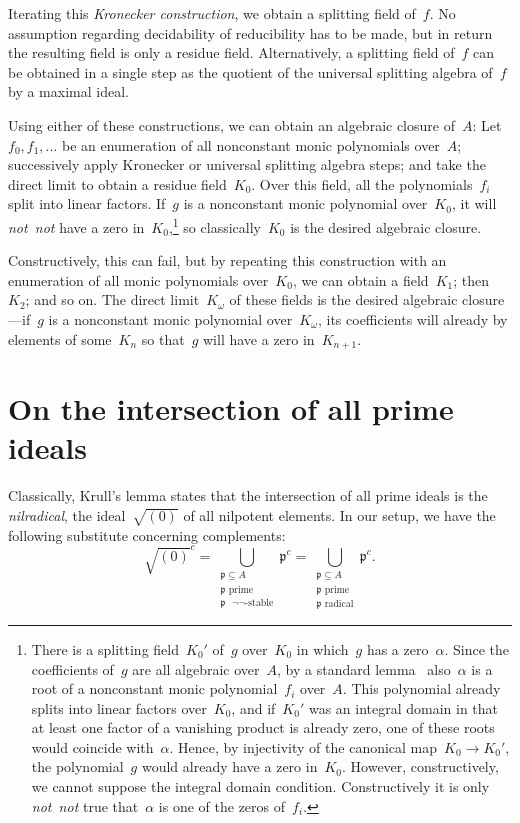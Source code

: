 \documentclass[com,11pt,crcready]{iosart2x}
\theoremstyle{definition}
\theoremstyle{plain}
\theoremstyle{remark}
\newcommand{\?}{\,{:}\,}
\newcommand{\ppp}{\mathfrak{p}}
\renewcommand{\_}{\mathpunct{.}\,}
\begin{document}
Iterating this \emph{Kronecker construction}, we obtain a splitting field of~$f$. No
assumption regarding decidability of reducibility has to be made, but in return
the resulting field is only a residue field. Alternatively, a splitting field
of~$f$ can be obtained in a single step as the quotient of the universal
splitting algebra of~$f$ by a maximal ideal.

Using either of these constructions, we can obtain an algebraic closure of~$A$:
Let~$f_0,f_1,\ldots$ be an enumeration of all nonconstant monic polynomials over~$A$;
successively apply Kronecker or universal splitting algebra steps; and take the
direct limit to obtain a residue field~$K_0$. Over this field, all the
polynomials~$f_i$ split into linear factors. If~$g$ is a nonconstant monic polynomial over~$K_0$,
it will \emph{not~not} have a zero in~$K_0$,\footnote{There is a splitting
field~$K_0'$ of~$g$ over~$K_0$ in which~$g$ has a zero~$\alpha$. Since the
coefficients of~$g$ are all algebraic over~$A$, by a standard
lemma~\cite[Corollary~VI.1.5]{mines-richman-ruitenburg:constructive-algebra} also~$\alpha$ is a root of a
nonconstant monic polynomial~$f_i$ over~$A$. This polynomial already splits into linear
factors over~$K_0$, and if~$K_0'$ was an integral domain in that at least one
factor of a vanishing product is already zero, one of these roots would
coincide with~$\alpha$. Hence, by injectivity of the canonical map~$K_0 \to
K_0'$, the polynomial~$g$ would already have a zero in~$K_0$. However,
constructively, we cannot suppose the integral domain condition. Constructively
it is only \emph{not~not} true that~$\alpha$ is one of the zeros of~$f_i$.}
so classically~$K_0$ is the desired algebraic closure.

Constructively, this can
fail, but by repeating this construction with an enumeration of all monic
polynomials over~$K_0$, we can obtain a field~$K_1$; then~$K_2$; and so on. The
direct limit~$K_\omega$ of these fields is the desired algebraic
closure---if~$g$ is a nonconstant monic polynomial over~$K_\omega$, its coefficients will
already by elements of some~$K_n$ so that~$g$ will have a zero in~$K_{n+1}$.


\section{On the intersection of all prime ideals}
\label{sect:krull}

Classically, Krull's lemma states that the intersection of all prime ideals is the
\emph{nilradical}, the ideal~$\sqrt{(0)}$ of all nilpotent elements. In our
setup, we have the following substitute concerning complements:
\[ \sqrt{(0)}^c =
  \bigcup_{\substack{\text{$\ppp \subseteq A$}\\\text{$\ppp$ prime}\\\text{$\ppp$ $\neg\neg$-stable}}} \ppp^c =
  \bigcup_{\substack{\text{$\ppp \subseteq A$}\\\text{$\ppp$ prime}\\\text{$\ppp$ radical}}} \ppp^c. \]
\end{document}
